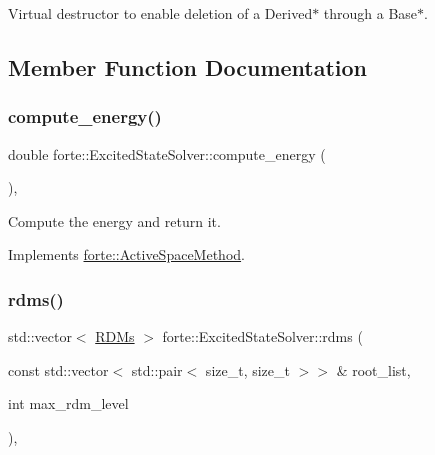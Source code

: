 Virtual destructor to enable deletion of a Derived$\ast$ through a Base$\ast$. 



\subsection{Member Function Documentation}
\mbox{\label{classforte_1_1_excited_state_solver_a35b840324fb9e080eda46f29e544c86a}} 
\subsubsection{\texorpdfstring{compute\+\_\+energy()}{compute\_energy()}}
{\footnotesize\ttfamily double forte\+::\+Excited\+State\+Solver\+::compute\+\_\+energy (\begin{DoxyParamCaption}{ }\end{DoxyParamCaption})\hspace{0.3cm}{\ttfamily [override]}, {\ttfamily [virtual]}}



Compute the energy and return it. 



Implements \mbox{\hyperlink{classforte_1_1_active_space_method_a99736e2b94405371b224b0750569b077}{forte\+::\+Active\+Space\+Method}}.

\mbox{\label{classforte_1_1_excited_state_solver_a67a061a196cc9e492fabc1b6c7995409}} 
\subsubsection{\texorpdfstring{rdms()}{rdms()}}
{\footnotesize\ttfamily std\+::vector$<$ \mbox{\hyperlink{classforte_1_1_r_d_ms}{R\+D\+Ms}} $>$ forte\+::\+Excited\+State\+Solver\+::rdms (\begin{DoxyParamCaption}\item[{const std\+::vector$<$ std\+::pair$<$ size\+\_\+t, size\+\_\+t $>$$>$ \&}]{root\+\_\+list,  }\item[{int}]{max\+\_\+rdm\+\_\+level }\end{DoxyParamCaption})\hspace{0.3cm}{\ttfamily [override]}, {\ttfamily [virtual]}}



